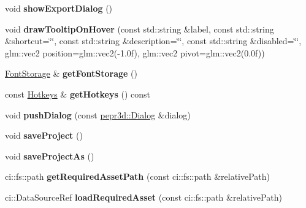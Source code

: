 \begin{DoxyCompactItemize}
void {\bfseries show\+Export\+Dialog} ()
\item 
\mbox{\label{classpepr3d_1_1_main_application_a82b879fdae70b8d0093c55c29bac2e5b}} 
void {\bfseries draw\+Tooltip\+On\+Hover} (const std\+::string \&label, const std\+::string \&shortcut=\char`\"{}\char`\"{}, const std\+::string \&description=\char`\"{}\char`\"{}, const std\+::string \&disabled=\char`\"{}\char`\"{}, glm\+::vec2 position=glm\+::vec2(-\/1.\+0f), glm\+::vec2 pivot=glm\+::vec2(0.\+0f))
\item 
\mbox{\label{classpepr3d_1_1_main_application_ae60f75eac8ad5d0ffda1541122c713a0}} 
\mbox{\hyperlink{classpepr3d_1_1_font_storage}{Font\+Storage}} \& {\bfseries get\+Font\+Storage} ()
\item 
\mbox{\label{classpepr3d_1_1_main_application_a21f4278d6d389508667b7a6a7b984c8b}} 
const \mbox{\hyperlink{classpepr3d_1_1_hotkeys}{Hotkeys}} \& {\bfseries get\+Hotkeys} () const
\item 
\mbox{\label{classpepr3d_1_1_main_application_adafee6ac798a97a338f1de8b5cece5d4}} 
void {\bfseries push\+Dialog} (const \mbox{\hyperlink{classpepr3d_1_1_dialog}{pepr3d\+::\+Dialog}} \&dialog)
\item 
\mbox{\label{classpepr3d_1_1_main_application_a3a21c18b808ee9cc2033f8a41ff64329}} 
void {\bfseries save\+Project} ()
\item 
\mbox{\label{classpepr3d_1_1_main_application_a96e83b00512d96b952d231e2db1a634b}} 
void {\bfseries save\+Project\+As} ()
\item 
\mbox{\label{classpepr3d_1_1_main_application_ab805488ee0fd1ec3548e92667e6ad248}} 
ci\+::fs\+::path {\bfseries get\+Required\+Asset\+Path} (const ci\+::fs\+::path \&relative\+Path)
\item 
\mbox{\label{classpepr3d_1_1_main_application_acfab9e02ede45fc96c2716370fdda96c}} 
ci\+::\+Data\+Source\+Ref {\bfseries load\+Required\+Asset} (const ci\+::fs\+::path \&relative\+Path)
\end{DoxyCompactItemize}
